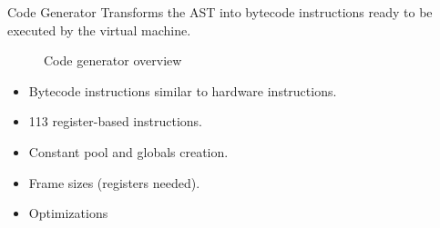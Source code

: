 \begin{slide}
    \begin{block}{Code Generator}
        Transforms the AST into bytecode instructions ready to be executed by the virtual machine.
    \end{block}
    \vfill
    \begin{figure}[H]
        \centering
        \caption{Code generator overview}
    \end{figure}
\end{slide}
\begin{slide}
    \begin{itemize}
        \item Bytecode instructions similar to hardware instructions.
        \item 113 register-based instructions.
        \item Constant pool and globals creation.
        \item Frame sizes (registers needed).
        \item Optimizations
    \end{itemize}
\end{slide}
